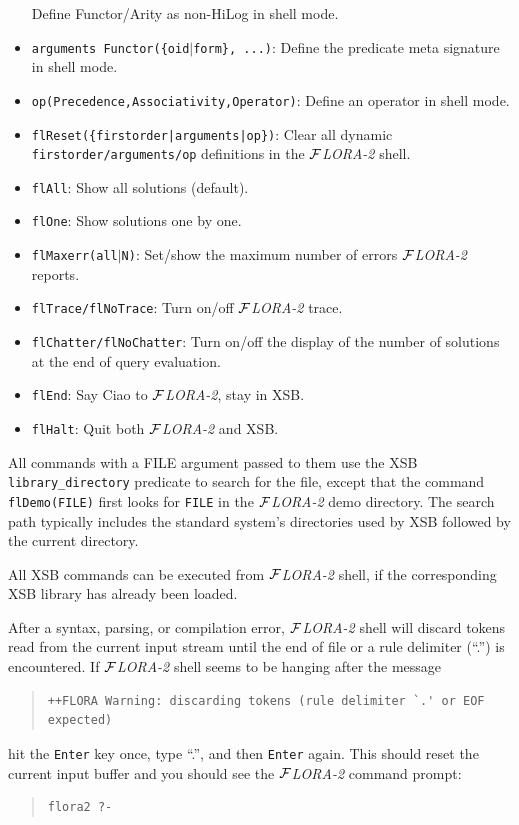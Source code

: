 \documentclass[11pt]{article}
\newcommand{\FLORA}{{\mbox{${\cal F}${\small\it LORA}\rm\emph{-2}}}\xspace}
\begin{document}
\begin{itemize}
    Define Functor/Arity as non-HiLog in shell mode.
\item {\tt arguments Functor(\{oid$|$form\}, ...)}:
    Define the predicate meta signature in shell mode.
\item {\tt op(Precedence,Associativity,Operator)}:
    Define an operator in shell mode.
\item {\tt flReset(\{firstorder|arguments|op\})}:
    Clear all dynamic {\tt firstorder/arguments/op}  definitions in the
    \FLORA shell.
\item {\tt flAll}:
    Show all solutions (default).
\item {\tt flOne}:
    Show solutions one by one.
\item {\tt flMaxerr(all$|$N)}:
    Set/show the maximum number of errors \FLORA reports.
\item {\tt flTrace/flNoTrace}:
    Turn on/off \FLORA trace.
\item {\tt flChatter/flNoChatter}:
    Turn on/off the display of the number of solutions at the end of query
    evaluation.
\item {\tt flEnd}:
    Say Ciao to \FLORA, stay in XSB.
\item {\tt flHalt}:
    Quit both \FLORA and XSB.
\end{itemize}
%

All commands with a FILE argument passed to them use the XSB
{\tt library\_directory} predicate to search for the file, except that the
command {\tt flDemo(FILE)} first looks for {\tt FILE} in the \FLORA demo
directory. The search path typically includes the standard system's
directories used by XSB followed by the current directory. 

All XSB commands can be executed from \FLORA shell, if the corresponding
XSB library has already been loaded.

After a syntax, parsing, or compilation error, \FLORA shell will
discard tokens read from the current input stream until the end of file or a
rule delimiter (``.'') is encountered. If \FLORA shell seems to be hanging
after the message
\begin{quote}
\begin{verbatim}
++FLORA Warning: discarding tokens (rule delimiter `.' or EOF expected)
\end{verbatim}
\end{quote}
hit the {\tt Enter} key once, type ``.'', and then {\tt Enter} again.  This
should reset the current input buffer and you should see the \FLORA command
prompt:
\begin{quote}
\begin{verbatim}
flora2 ?-
\end{verbatim}
\end{quote}
\end{document}
